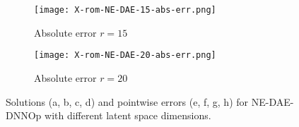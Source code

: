 \begin{figure}[!htb]
\begin{center}
\begin{subfigure}[b]{0.23\textwidth}
        \end{subfigure}   
        \begin{subfigure}[b]{0.23\textwidth}
            \begin{center}
            \texttt{[image: X-rom-NE-DAE-15-abs-err.png]}
            \end{center}
            \caption{Absolute error $r = 15$}
        \end{subfigure}    
        \begin{subfigure}[b]{0.23\textwidth}
            \begin{center}
                \texttt{[image: X-rom-NE-DAE-20-abs-err.png]}
            \caption{Absolute error $r = 20$}
            \end{center}
        \end{subfigure}
     \end{center}
     \caption[Solutions and pointwise errors for NE-DAE-DNNOp.]{Solutions (a, b, c, d) and pointwise errors (e, f, g, h) for NE-DAE-DNNOp with different latent space dimensions.}
        \label{fig: nedae-burger}
\end{figure}